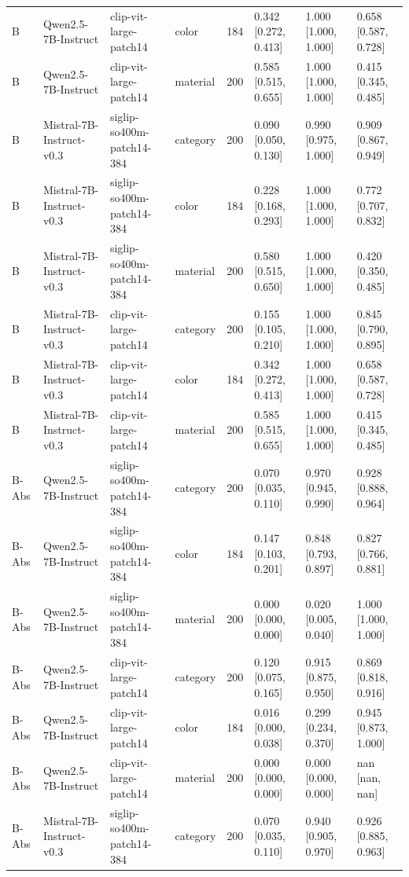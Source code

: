 \begin{tabular}{llllrlll}
B & Qwen2.5-7B-Instruct & clip-vit-large-patch14 & color & 184 & 0.342 [0.272, 0.413] & 1.000 [1.000, 1.000] & 0.658 [0.587, 0.728] \\
B & Qwen2.5-7B-Instruct & clip-vit-large-patch14 & material & 200 & 0.585 [0.515, 0.655] & 1.000 [1.000, 1.000] & 0.415 [0.345, 0.485] \\
B & Mistral-7B-Instruct-v0.3 & siglip-so400m-patch14-384 & category & 200 & 0.090 [0.050, 0.130] & 0.990 [0.975, 1.000] & 0.909 [0.867, 0.949] \\
B & Mistral-7B-Instruct-v0.3 & siglip-so400m-patch14-384 & color & 184 & 0.228 [0.168, 0.293] & 1.000 [1.000, 1.000] & 0.772 [0.707, 0.832] \\
B & Mistral-7B-Instruct-v0.3 & siglip-so400m-patch14-384 & material & 200 & 0.580 [0.515, 0.650] & 1.000 [1.000, 1.000] & 0.420 [0.350, 0.485] \\
B & Mistral-7B-Instruct-v0.3 & clip-vit-large-patch14 & category & 200 & 0.155 [0.105, 0.210] & 1.000 [1.000, 1.000] & 0.845 [0.790, 0.895] \\
B & Mistral-7B-Instruct-v0.3 & clip-vit-large-patch14 & color & 184 & 0.342 [0.272, 0.413] & 1.000 [1.000, 1.000] & 0.658 [0.587, 0.728] \\
B & Mistral-7B-Instruct-v0.3 & clip-vit-large-patch14 & material & 200 & 0.585 [0.515, 0.655] & 1.000 [1.000, 1.000] & 0.415 [0.345, 0.485] \\
B-Abs & Qwen2.5-7B-Instruct & siglip-so400m-patch14-384 & category & 200 & 0.070 [0.035, 0.110] & 0.970 [0.945, 0.990] & 0.928 [0.888, 0.964] \\
B-Abs & Qwen2.5-7B-Instruct & siglip-so400m-patch14-384 & color & 184 & 0.147 [0.103, 0.201] & 0.848 [0.793, 0.897] & 0.827 [0.766, 0.881] \\
B-Abs & Qwen2.5-7B-Instruct & siglip-so400m-patch14-384 & material & 200 & 0.000 [0.000, 0.000] & 0.020 [0.005, 0.040] & 1.000 [1.000, 1.000] \\
B-Abs & Qwen2.5-7B-Instruct & clip-vit-large-patch14 & category & 200 & 0.120 [0.075, 0.165] & 0.915 [0.875, 0.950] & 0.869 [0.818, 0.916] \\
B-Abs & Qwen2.5-7B-Instruct & clip-vit-large-patch14 & color & 184 & 0.016 [0.000, 0.038] & 0.299 [0.234, 0.370] & 0.945 [0.873, 1.000] \\
B-Abs & Qwen2.5-7B-Instruct & clip-vit-large-patch14 & material & 200 & 0.000 [0.000, 0.000] & 0.000 [0.000, 0.000] & nan [nan, nan] \\
B-Abs & Mistral-7B-Instruct-v0.3 & siglip-so400m-patch14-384 & category & 200 & 0.070 [0.035, 0.110] & 0.940 [0.905, 0.970] & 0.926 [0.885, 0.963] \\

\end{tabular}
